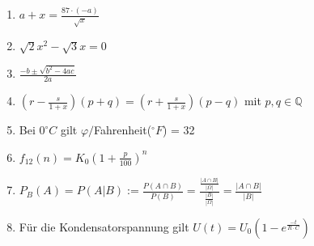 \begin{enumerate}
\item $a+x=\frac{87\cdot(-a)}{\sqrt{x}}$
\item $\sqrt{2}x^2 - \sqrt{3}x = 0$
\item $\frac{-b \pm \sqrt{b^2-4ac}}{2a}$
\item
$\left(r-\frac{s}{1+x}\right)(p+q)=\left(r+\frac{s}{1+x}\right)(p-q)$
mit $p, q \in \mathbb{Q}$
\item Bei $0^{\circ}C$ gilt $\varphi/$Fahrenheit($^\circ{}F$) =
32
\item $f_{12}(n) = K_0\left(1+\frac{p}{100}\right)^n$
\item $P_B(A)=P(A|B) := \frac{P(A\cap{}B)}{P(B)}
= \frac{\frac{|A\cap{}B|}{|\Omega|}}{\frac{|B|}{|\Omega|}} = \frac{|A\cap{}B|}{|B|}$
\item Für die Kondensatorspannung gilt $U(t) = U_0\left(1-e^{\frac{-t}{R\cdot{}C}}\right)$
\end{enumerate}



